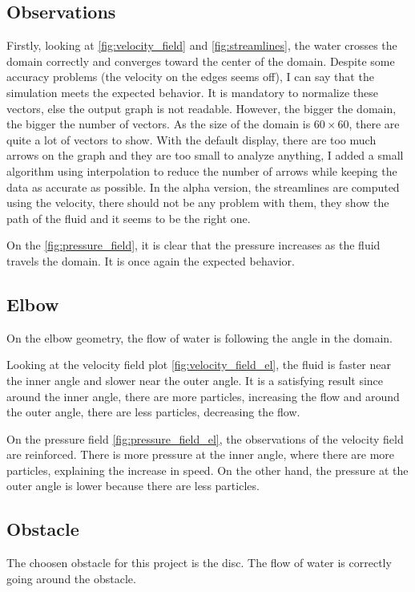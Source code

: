 \subsection{Observations}
Firstly, looking at \autoref{fig:velocity_field} and \autoref{fig:streamlines},
the water crosses the domain correctly and converges toward the center of the
domain. Despite some accuracy problems (the velocity on the edges seems off),
I can say that the simulation meets the expected behavior. It is mandatory to
normalize these vectors, else the output graph is not readable. However, the
bigger the domain, the bigger the number of vectors. As the size of the domain 
is $\num{60} \times \num{60}$, there are quite a lot of vectors to show. With
the default display, there are too much arrows on the graph and they are too
small to analyze anything, I added a small algorithm using interpolation to
reduce the number of arrows while keeping the data as accurate as possible.
In the alpha version, the streamlines are computed using the velocity, there
should not be any problem with them, they show the path of the fluid and it
seems to be the right one.

On the \autoref{fig:pressure_field}, it is clear that the pressure increases as
the fluid travels the domain. It is once again the expected behavior.

\subsection{Elbow}
On the elbow geometry, the flow of water is following the angle in the domain.

Looking at the velocity field plot \autoref{fig:velocity_field_el}, the fluid
is faster near the inner angle and slower near the outer angle. It is a
satisfying result since around the inner angle, there are more particles,
increasing the flow and around the outer angle, there are less particles,
decreasing the flow.

On the pressure field \autoref{fig:pressure_field_el}, the observations of the
velocity field are reinforced. There is more pressure at the inner angle, where
there are more particles, explaining the increase in speed. On the other hand,
the pressure at the outer angle is lower because there are less particles.

\subsection{Obstacle}
The choosen obstacle for this project is the disc. The flow of water is
correctly going around the obstacle.

